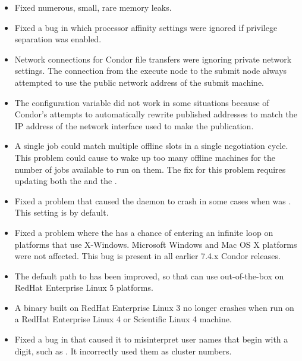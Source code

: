 \begin{itemize}
\item
  Fixed numerous, small, rare memory leaks.

\item 
  Fixed a bug in which processor affinity settings were ignored if
  privilege separation was enabled.

\item Network connections for Condor file transfers were ignoring
  private network settings.  The connection from the execute node to
  the submit node always attempted to use the public network address
  of the submit machine.

\item The configuration variable  did not work
in some situations
because of Condor's attempts to automatically rewrite published addresses to
match the IP address of the network interface used to make the publication.

\item A single job could match multiple offline slots in a single
negotiation cycle.  This problem could cause  to
wake up too many offline machines for the number of jobs available
to run on them.  The fix for this problem requires updating both
the  and the .

\item Fixed a problem that caused the  daemon to
crash in some cases when  was .
This setting is  by default.

\item Fixed a problem where the  has a chance of
entering an infinite loop on platforms that use X-Windows.
Microsoft Windows and Mac OS X platforms were not affected.  This bug is
present in all earlier 7.4.x Condor releases.

\item The default path to  has been improved,
 so that  can use  out-of-the-box on 
RedHat Enterprise Linux 5 platforms.

\item A  binary built on RedHat Enterprise Linux 3
no longer crashes
when run on a RedHat Enterprise Linux 4 or Scientific Linux 4 machine.

\item Fixed a bug in  that caused it to misinterpret user names
that begin with a digit, such as .
It incorrectly used them as cluster numbers. 


\end{itemize}
